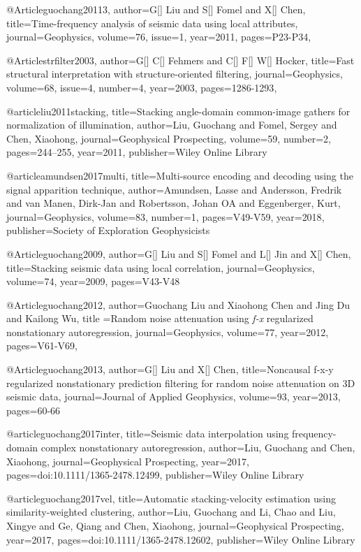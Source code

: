 @Article{guochang20113,
author={G[] Liu and S[] Fomel and X[] Chen},
title={Time-frequency analysis of seismic data using local attributes},
journal={Geophysics},
volume=76,
issue=1,
year=2011,
pages={P23-P34},
}

@Article{strfilter2003,
author={G[] C[] Fehmers and C[] F[] W[] Hocker},
title={Fast structural interpretation with structure-oriented filtering},
journal={Geophysics},
volume=68,
issue=4,
number=4,
year=2003,
pages={1286-1293},
}




@article{liu2011stacking,
  title={Stacking angle-domain common-image gathers for normalization of illumination},
  author={Liu, Guochang and Fomel, Sergey and Chen, Xiaohong},
  journal={Geophysical Prospecting},
  volume={59},
  number={2},
  pages={244--255},
  year={2011},
  publisher={Wiley Online Library}
}

@article{amundsen2017multi,
  title={Multi-source encoding and decoding using the signal apparition technique},
  author={Amundsen, Lasse and Andersson, Fredrik and van Manen, Dirk-Jan and Robertsson, Johan OA and Eggenberger, Kurt},
  journal={Geophysics},
  volume={83},
  number={1},
  pages={V49-V59},
  year={2018},
  publisher={Society of Exploration Geophysicists}
}



@Article{guochang2009,
author={G[] Liu and S[] Fomel and L[] Jin and X[] Chen},
title={Stacking seismic data using local correlation},
journal={Geophysics},
volume=74,
year=2009,
pages={V43-V48}
}

@Article{guochang2012,
  author={Guochang Liu and Xiaohong Chen and Jing Du and Kailong Wu},
  title ={Random noise attenuation using \emph{f-x} regularized nonstationary autoregression},
  journal={Geophysics},
  volume=77,
  year=2012,
  pages={V61-V69},
}

@Article{guochang2013,
author={G[] Liu and X[] Chen},
title={Noncausal f-x-y regularized nonstationary prediction filtering for random noise attenuation on 3{D} seismic data},
journal={Journal of Applied Geophysics},
volume=93,
year=2013,
pages={60-66}
}

@article{guochang2017inter,
  title={Seismic data interpolation using frequency-domain complex nonstationary autoregression},
  author={Liu, Guochang and Chen, Xiaohong},
  journal={Geophysical Prospecting},
  year={2017},
  pages={doi:10.1111/1365-2478.12499},
  publisher={Wiley Online Library}
}

@article{guochang2017vel,
  title={Automatic stacking-velocity estimation using similarity-weighted clustering},
  author={Liu, Guochang and Li, Chao and Liu, Xingye and Ge, Qiang and Chen, Xiaohong},
  journal={Geophysical Prospecting},
  year={2017},
  pages={doi:10.1111/1365-2478.12602},
  publisher={Wiley Online Library}
}

